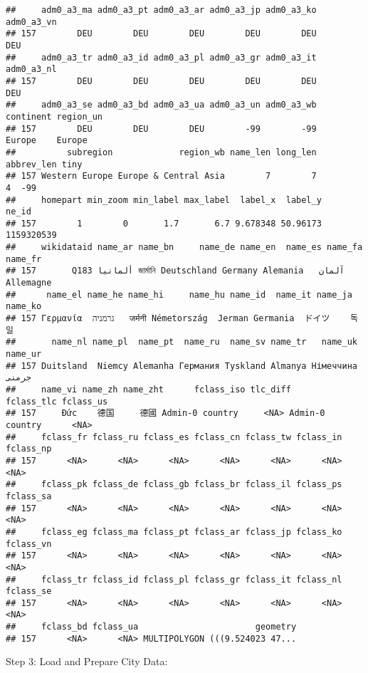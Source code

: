 \documentclass[
]{article}
\begin{document}
\begin{verbatim}
##     adm0_a3_ma adm0_a3_pt adm0_a3_ar adm0_a3_jp adm0_a3_ko adm0_a3_vn
## 157        DEU        DEU        DEU        DEU        DEU        DEU
##     adm0_a3_tr adm0_a3_id adm0_a3_pl adm0_a3_gr adm0_a3_it adm0_a3_nl
## 157        DEU        DEU        DEU        DEU        DEU        DEU
##     adm0_a3_se adm0_a3_bd adm0_a3_ua adm0_a3_un adm0_a3_wb continent region_un
## 157        DEU        DEU        DEU        -99        -99    Europe    Europe
##          subregion             region_wb name_len long_len abbrev_len tiny
## 157 Western Europe Europe & Central Asia        7        7          4  -99
##     homepart min_zoom min_label max_label  label_x  label_y      ne_id
## 157        1        0       1.7       6.7 9.678348 50.96173 1159320539
##     wikidataid name_ar name_bn     name_de name_en  name_es name_fa   name_fr
## 157       Q183 ألمانيا জার্মানি Deutschland Germany Alemania   آلمان Allemagne
##      name_el name_he name_hi     name_hu name_id  name_it name_ja name_ko
## 157 Γερμανία  גרמניה   जर्मनी Németország  Jerman Germania  ドイツ    독일
##       name_nl name_pl  name_pt  name_ru  name_sv name_tr   name_uk name_ur
## 157 Duitsland  Niemcy Alemanha Германия Tyskland Almanya Німеччина   جرمنی
##     name_vi name_zh name_zht      fclass_iso tlc_diff      fclass_tlc fclass_us
## 157     Đức    德国     德國 Admin-0 country     <NA> Admin-0 country      <NA>
##     fclass_fr fclass_ru fclass_es fclass_cn fclass_tw fclass_in fclass_np
## 157      <NA>      <NA>      <NA>      <NA>      <NA>      <NA>      <NA>
##     fclass_pk fclass_de fclass_gb fclass_br fclass_il fclass_ps fclass_sa
## 157      <NA>      <NA>      <NA>      <NA>      <NA>      <NA>      <NA>
##     fclass_eg fclass_ma fclass_pt fclass_ar fclass_jp fclass_ko fclass_vn
## 157      <NA>      <NA>      <NA>      <NA>      <NA>      <NA>      <NA>
##     fclass_tr fclass_id fclass_pl fclass_gr fclass_it fclass_nl fclass_se
## 157      <NA>      <NA>      <NA>      <NA>      <NA>      <NA>      <NA>
##     fclass_bd fclass_ua                       geometry
## 157      <NA>      <NA> MULTIPOLYGON (((9.524023 47...
\end{verbatim}

Step 3: Load and Prepare City Data:
\end{document}
